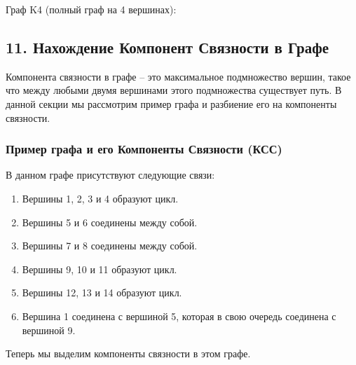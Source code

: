 \documentclass{article}
\begin{document}
Граф K4 (полный граф на 4 вершинах):
\begin{center}
\end{center}
\pagebreak


\subsection*{11. Нахождение Компонент Связности в Графе}
Компонента связности в графе – это максимальное подмножество вершин, такое что между любыми двумя вершинами этого подмножества существует путь. В данной секции мы рассмотрим пример графа и разбиение его на компоненты связности.

\subsubsection*{Пример графа и его Компоненты Связности (КСС)}

\begin{center}
\end{center}

В данном графе присутствуют следующие связи:
\begin{enumerate}
\item Вершины 1, 2, 3 и 4 образуют цикл.
\item Вершины 5 и 6 соединены между собой.
\item Вершины 7 и 8 соединены между собой.
\item Вершины 9, 10 и 11 образуют цикл.
\item Вершины 12, 13 и 14 образуют цикл.
\item Вершина 1 соединена с вершиной 5, которая в свою очередь соединена с вершиной 9.
\end{enumerate}
Теперь мы выделим компоненты связности в этом графе.
\end{document}
